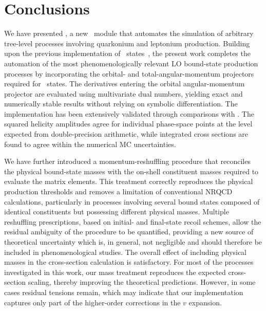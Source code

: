 \section{Conclusions}\label{sec:conclusions}

We have presented \madsons, a new \mgshort\ module that automates the simulation of
arbitrary tree-level processes involving quarkonium and leptonium production.
Building upon the previous implementation of \swavetxt\ states~\cite{ColpaniSerri:2025vdz}, the present work completes the automation of the most phenomenologically relevant LO bound-state production processes by incorporating the orbital- and total-angular-momentum projectors required for \pwavetxt\ states.
The derivatives entering the orbital angular-momentum projector are evaluated using multivariate dual numbers, yielding exact and numerically stable results without relying on symbolic differentiation. 
The implementation has been extensively validated through comparisons with \helaconia. The squared helicity amplitudes agree for individual phase-space points at the level expected from double-precision arithmetic, while integrated cross sections are found to agree within the numerical MC uncertainties. 

We have further introduced a momentum-reshuffling procedure that reconciles the physical bound-state masses with the on-shell constituent masses required to evaluate the matrix elements. This treatment correctly reproduces the physical production thresholds and removes a limitation of conventional NRQCD calculations, particularly in processes involving several bound states composed of identical constituents but possessing different physical masses. Multiple reshuffling prescriptions, based on initial- and final-state recoil schemes, allow the residual ambiguity of the procedure to be quantified, providing a new source of theoretical uncertainty which is, in general, not negligible and should therefore be included in phenomenological studies.
The overall effect of including physical masses in the cross-section calculation is satisfactory. For most of the processes investigated in this work, our mass treatment reproduces the expected cross-section scaling, thereby improving the theoretical predictions. However, in some cases residual tensions remain, which may indicate that our implementation captures only part of the higher-order corrections in the $v$ expansion.

